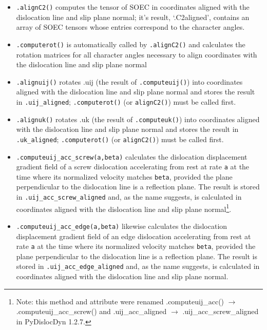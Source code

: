 \documentclass[11pt,letterpaper,oneside,pdftex]{article}
\begin{document}
\begin{itemize}
\item \verb|.alignC2()| computes the tensor of SOEC in coordinates aligned with the dislocation line and slip plane normal; it’s result, ‘.C2aligned’, contains an array of SOEC tensors whose entries correspond to the character angles.

\item \verb|.computerot()| is automatically called by \verb|.alignC2()| and calculates the rotation matrices for all character angles necessary to align coordinates with the dislocation line and slip plane normal

\item \verb|.alignuij()| rotates .uij (the result of \verb|.computeuij()|) into coordinates aligned with the dislocation line and slip plane normal and stores the result in \verb|.uij_aligned|; \verb|.computerot()| (or \verb|alignC2()|) must be called first.

\item \verb|.alignuk()| rotates .uk (the result of \verb|.computeuk()|) into coordinates aligned with the dislocation line and slip plane normal and stores the result in \verb|.uk_aligned|; \verb|.computerot()| (or \verb|alignC2()|) must be called first.

\item \verb|.computeuij_acc_screw(a,beta)| calculates the dislocation displacement gradient field of a screw dislocation accelerating from rest at rate \verb|a| at the time where its normalized velocity matches \verb|beta|, provided the plane perpendicular to the dislocation line is a reflection plane.
The result is stored in \verb|.uij_acc_screw_aligned| and, as the name suggests, is calculated in coordinates aligned with the dislocation line and slip plane normal\footnote{
Note: this method and attribute were renamed  .computeuij\_acc() $\to$ .computeuij\_acc\_screw() and .uij\_acc\_aligned $\to$ .uij\_acc\_screw\_aligned in PyDislocDyn 1.2.7.}.

\item \verb|.computeuij_acc_edge(a,beta)| likewise calculates the dislocation displacement gradient field of an edge dislocation accelerating from rest at rate \verb|a| at the time where its normalized velocity matches \verb|beta|, provided the plane perpendicular to the dislocation line is a reflection plane.
The result is stored in \verb|.uij_acc_edge_aligned| and, as the name suggests, is calculated in coordinates aligned with the dislocation line and slip plane normal.


\end{itemize}
\end{document}

